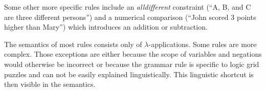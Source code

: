 Some other more specific rules include an \textit{alldifferent} constraint (``A, B, and C are three different persons'') and a numerical comparison (``John scored 3 points higher than Mary'') which introduces an addition or subtraction.

The semantics of most rules consists only of $\lambda$-applications. Some rules are more complex. Those exceptions are either because the scope of variables and negations would otherwise be incorrect or because the grammar rule is specific to logic grid puzzles and can not be easily explained linguistically. This linguistic shortcut is then visible in the semantics.


